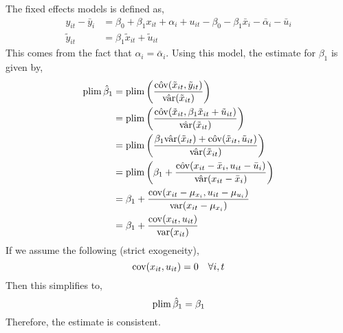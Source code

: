 \documentclass[12pt,twoside]{article}
\begin{document}
\begin{problems}
\begin{problemparts}
The fixed effects models is defined as,
\begin{align*}
    y_{it} - \bar{y}_i &= \beta_0 + \beta_1 x_{it} + \alpha_i + u_{it} -
    \beta_0 - \beta_1 \bar{x}_i - \bar{\alpha}_i - \bar{u}_i \\
    \tilde{y}_{it} &= \beta_1 \tilde{x}_{it} + \tilde{u}_{it}
\end{align*}
This comes from the fact that $\alpha_i = \bar{\alpha}_i$. Using this model,
the estimate for $\beta_1$ is given by,
\begin{align*}
    \operatorname{plim} \hat{\beta}_1 &= \operatorname{plim} \left( \frac{\hat{\operatorname{cov}}(\tilde{x}_{it},
    \tilde{y}_{it})}{\hat{\operatorname{var}}(\tilde{x}_{it})} \right) \\
    &= \operatorname{plim} \left(\frac{\hat{\operatorname{cov}}(\tilde{x}_{it}, \beta_1 \tilde{x}_{it} +
    \tilde{u}_{it})}{\hat{\operatorname{var}}(\tilde{x}_{it})}\right) \\
    &= \operatorname{plim} \left( \frac{\beta_1 \hat{\operatorname{var}}(\tilde{x}_{it}) +
    \hat{\operatorname{cov}}(\tilde{x}_{it},
    \tilde{u}_{it})}{\hat{\operatorname{var}}(\tilde{x}_{it})}\right) \\
    &= \operatorname{plim} \left(\beta_1 + \frac{\hat{\operatorname{cov}}(x_{it} - \bar{x}_i, u_{it} -
    \bar{u}_i)}{\hat{\operatorname{var}}(x_{it} - \bar{x}_i)}\right) \\
    &= \beta_1 + \frac{\operatorname{cov}(x_{it} - \mu_{x_i}, u_{it} -
    \mu_{u_i})}{\operatorname{var}(x_{it} - \mu_{x_i})} \\
    &= \beta_1 + \frac{\operatorname{cov}(x_{it}, u_{it})}{\operatorname{var}(x_{it})} \\
\end{align*}
If we assume the following (strict exogeneity),
$$ \operatorname{cov}(x_{it}, u_{it}) = 0\quad \forall i, t $$
Then this simplifies to,
$$ \operatorname{plim} \hat{\beta}_1 = \beta_1 $$
Therefore, the estimate is consistent.

\end{problemparts}

\end{problems}
\end{document}
